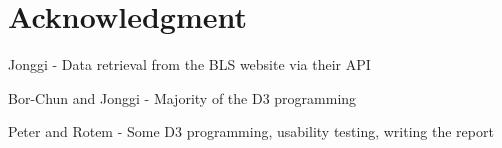 \documentclass[journal]{IEEEtran}
\begin{document}
\section*{Acknowledgment}

Jonggi - Data retrieval from the BLS website via their API

Bor-Chun and Jonggi - Majority of the D3 programming

Peter and Rotem - Some D3 programming, usability testing, writing the report







\end{document}
